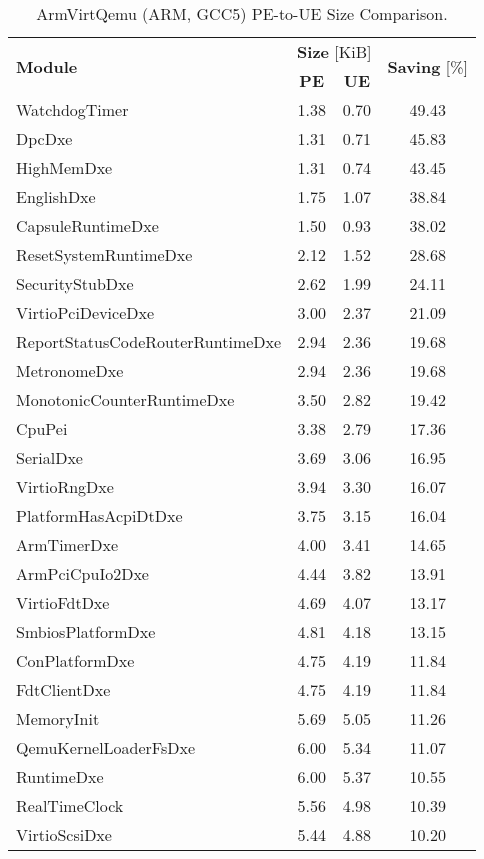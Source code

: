 \begin{longtable}{l c c c}
  \caption{ArmVirtQemu (ARM, GCC5) PE-to-UE Size Comparison.}\\\\
  \toprule
  \multirow{2}{*}[-2pt]{\textbf{Module}} & \multicolumn{2}{c}{\textbf{Size} [KiB]} & \multirow{2}{*}[-2pt]{\textbf{Saving} [\%]}\\
  \cmidrule{2-3}
  & \textbf{PE} & \textbf{UE} &\\
  \midrule
  WatchdogTimer & 1.38 & 0.70 & 49.43\\
  DpcDxe & 1.31 & 0.71 & 45.83\\
  HighMemDxe & 1.31 & 0.74 & 43.45\\
  EnglishDxe & 1.75 & 1.07 & 38.84\\
  CapsuleRuntimeDxe & 1.50 & 0.93 & 38.02\\
  ResetSystemRuntimeDxe & 2.12 & 1.52 & 28.68\\
  SecurityStubDxe & 2.62 & 1.99 & 24.11\\
  VirtioPciDeviceDxe & 3.00 & 2.37 & 21.09\\
  ReportStatusCodeRouterRuntimeDxe & 2.94 & 2.36 & 19.68\\
  MetronomeDxe & 2.94 & 2.36 & 19.68\\
  MonotonicCounterRuntimeDxe & 3.50 & 2.82 & 19.42\\
  CpuPei & 3.38 & 2.79 & 17.36\\
  SerialDxe & 3.69 & 3.06 & 16.95\\
  VirtioRngDxe & 3.94 & 3.30 & 16.07\\
  PlatformHasAcpiDtDxe & 3.75 & 3.15 & 16.04\\
  ArmTimerDxe & 4.00 & 3.41 & 14.65\\
  ArmPciCpuIo2Dxe & 4.44 & 3.82 & 13.91\\
  VirtioFdtDxe & 4.69 & 4.07 & 13.17\\
  SmbiosPlatformDxe & 4.81 & 4.18 & 13.15\\
  ConPlatformDxe & 4.75 & 4.19 & 11.84\\
  FdtClientDxe & 4.75 & 4.19 & 11.84\\
  MemoryInit & 5.69 & 5.05 & 11.26\\
  QemuKernelLoaderFsDxe & 6.00 & 5.34 & 11.07\\
  RuntimeDxe & 6.00 & 5.37 & 10.55\\
  RealTimeClock & 5.56 & 4.98 & 10.39\\
  VirtioScsiDxe & 5.44 & 4.88 & 10.20\\

\end{longtable}
